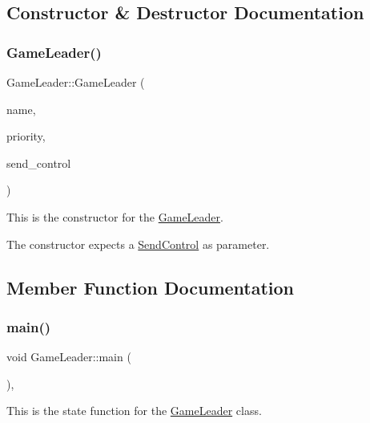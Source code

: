 \subsection{Constructor \& Destructor Documentation}
\mbox{\label{class_game_leader_a37f89b9731c43cb875207ebbbcdcc96f}} 
\subsubsection{\texorpdfstring{Game\+Leader()}{GameLeader()}}
{\footnotesize\ttfamily Game\+Leader\+::\+Game\+Leader (\begin{DoxyParamCaption}\item[{const char $\ast$}]{name,  }\item[{int}]{priority,  }\item[{\mbox{\hyperlink{class_send_control}{Send\+Control}} \&}]{send\+\_\+control }\end{DoxyParamCaption})\hspace{0.3cm}{\ttfamily [inline]}}



This is the constructor for the \mbox{\hyperlink{class_game_leader}{Game\+Leader}}. 

The constructor expects a \mbox{\hyperlink{class_send_control}{Send\+Control}} as parameter. 

\subsection{Member Function Documentation}
\mbox{\label{class_game_leader_a83c1a53edf86e4a740c6e4a08f022f36}} 
\subsubsection{\texorpdfstring{main()}{main()}}
{\footnotesize\ttfamily void Game\+Leader\+::main (\begin{DoxyParamCaption}{ }\end{DoxyParamCaption})\hspace{0.3cm}{\ttfamily [inline]}, {\ttfamily [override]}}



This is the state function for the \mbox{\hyperlink{class_game_leader}{Game\+Leader}} class. 

